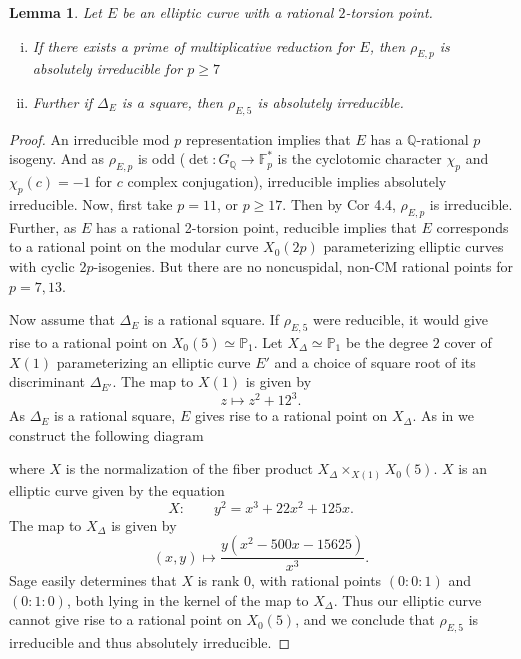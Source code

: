 \documentclass[12pt]{amsart}
\newtheorem{lem}[thm]{Lemma}
\theoremstyle{definition}
\def\F{{\mathbb F}}
\def\P{{{\mathbb P}}}
\def\Q{{\mathbb Q}}
\begin{document}
\begin{lem}\label{absirr}
Let $E$ be an elliptic curve with a rational $2$-torsion point.   
\begin{enumerate}[(i)]
\item If there exists a prime of multiplicative reduction for $E$, then $\rho_{E,p}$ is absolutely irreducible for $p \geq 7$
\item Further if $\Delta_E$ is a square, then $\rho_{E,5}$ is absolutely irreducible.
\end{enumerate}
\end{lem}
\begin{proof}
An irreducible mod $p$ representation implies that $E$ has a $\Q$-rational $p$ isogeny.  And as $\rho_{E,p}$ is odd ($\det: G_\Q \rightarrow \F_p^*$ is the cyclotomic character $\chi_p$ and $\chi_p(c)=-1$ for $c$ complex conjugation), irreducible implies absolutely irreducible.  
Now, first take $p =11$, or $p \geq 17$.  Then by \cite{mazur78} Cor 4.4, $\rho_{E,p}$ is irreducible.  Further, as $E$ has a rational 2-torsion point, reducible implies that $E$ corresponds to a rational point on the modular curve $X_0(2p)$ parameterizing elliptic curves with cyclic $2p$-isogenies.  But there are no noncuspidal, non-CM rational points for $p = 7,13$.

Now assume that $\Delta_E$ is a rational square.  If $\rho_{E,5}$ were reducible, it would give rise to a rational point on $X_0(5) \simeq \P_1$.  Let $X_{\Delta} \simeq \P_1$ be the degree $2$ cover of $X(1)$ parameterizing an elliptic curve $E'$ and a choice of square root of its discriminant $\Delta_{E'}$.  The map to $X(1)$ is given by
\[z \mapsto z^2 + 12^3. \]
As $\Delta_E$ is a rational square, $E$ gives rise to a rational point on $X_{\Delta}$.
As in \cite{brown12} we construct the following diagram
\begin{center}
\end{center}
where $X$ is the normalization of the fiber product $X_{\Delta} \times_{X(1)} X_0(5)$.  $X$ is an elliptic curve given by the equation
\[X: \qquad  y^2 = x^3 + 22x^2 +125x .\]
The map to $X_{\Delta}$ is given by
\[ (x,y) \mapsto \frac{y(x^2-500x -15625)}{x^3}. \]
Sage easily determines that $X$ is rank $0$, with rational points $(0:0:1)$ and $(0:1:0)$, both lying in the kernel of the map to $X_{\Delta}$.  Thus our elliptic curve cannot give rise to a rational point on $X_0(5)$, and we conclude that $\rho_{E,5}$ is irreducible and thus absolutely irreducible.
\end{proof}
\end{document}

